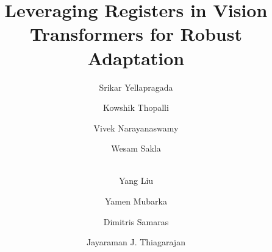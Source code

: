 \documentclass[conference]{IEEEtran}
\begin{document}
\renewcommand\Authands{,}

\newcommand{\affiliations}[2]{%
  \vspace{-\bigskipamount}  %
  \begin{center}
    \Affilfont
    \textsuperscript{1}#1,
    \textsuperscript{2}#2
  \end{center}
}


\title{Leveraging Registers in Vision Transformers for Robust Adaptation\\
}
% 

\author[1]{Srikar Yellapragada}
\author[2]{Kowshik Thopalli}
\author[2]{Vivek Narayanaswamy}
\author[2]{Wesam Sakla} 
\author[2]{\\Yang Liu}
\author[2]{Yamen Mubarka}
\author[1]{Dimitris Samaras}
\author[2]{ Jayaraman J. Thiagarajan}



\maketitle
\end{document}
